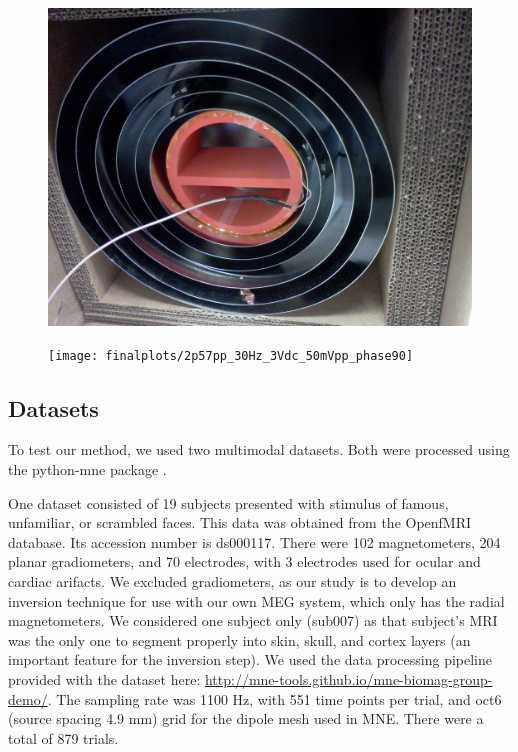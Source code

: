 \documentclass[journal,12pt,onecolumn,draftclsnofoot]{IEEEtran}
\begin{document}
\begin{figure}[h!]
\centering
\includegraphics[width=5in]{finalplots/helmholtz_in_shield}
\caption{}
\label{fig:fg}
\end{figure}

\begin{figure}[h!]
\centering
\texttt{[image: finalplots/2p57pp\_30Hz\_3Vdc\_50mVpp\_phase90]}
\caption{}
\label{fig:test}
\end{figure}


\subsection{Datasets}

To test our method, we used two multimodal datasets. Both were processed using the python-mne package \cite{gramfort2014mne}.

One dataset \cite{wakeman2015multi} consisted of 19 subjects presented with stimulus of famous, unfamiliar, or scrambled faces. This data was obtained from the OpenfMRI database. Its accession number is ds000117. There were 102 magnetometers, 204 planar gradiometers, and 70 electrodes, with 3 electrodes used for ocular and cardiac arifacts. We excluded gradiometers, as our study is to develop an inversion technique for use with our own MEG system, which only has the radial magnetometers. We considered one subject only (sub007) as that subject's MRI was the only one to segment properly into skin, skull, and cortex layers (an important feature for the inversion step). We used the data processing pipeline provided with the dataset here: \url{http://mne-tools.github.io/mne-biomag-group-demo/}. The sampling rate was 1100 Hz, with 551 time points per trial, and oct6 (source spacing 4.9 mm) grid for the dipole mesh used in MNE. There were a total of 879 trials.
\end{document}
